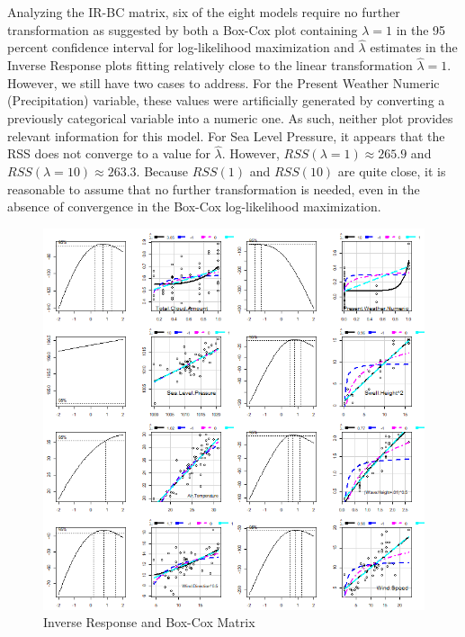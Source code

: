 \documentclass{article}
\begin{document}
Analyzing the IR-BC matrix, six of the eight models require no further transformation as suggested by both a Box-Cox plot containing $\lambda = 1$ in the 95 percent confidence interval for log-likelihood maximization and $\hat \lambda$ estimates in the Inverse Response plots fitting relatively close to the linear transformation $\hat \lambda = 1$. However, we still have two cases to address. For the Present Weather Numeric (Precipitation) variable, these values were artificially generated by converting a previously categorical variable into a numeric one. As such, neither plot provides relevant information for this model. For Sea Level Pressure, it appears that the RSS does not converge to a value for $\hat \lambda$. However, $RSS(\lambda = 1) \approx 265.9$ and $RSS(\lambda = 10) \approx 263.3$. Because $RSS(1)$ and $RSS(10)$ are quite close, it is reasonable to assume that no further transformation is needed, even in the absence of convergence in the Box-Cox log-likelihood maximization.

\newpage

\begin{figure}[h]
    \centering
    \includegraphics[scale = 0.45]{volume/IRBC_Matrix.png}
    \caption{Inverse Response and Box-Cox Matrix}
    \label{fig:IRBC}
\end{figure}
\end{document}
